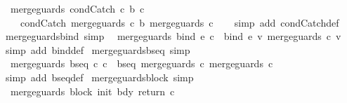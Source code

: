 \begin{isabellebody}
\ \ {\isachardoublequoteopen}merge{\isacharunderscore}guards\ {\isacharparenleft}condCatch\ c{}\ b\ c{}{\isacharparenright}\ {\isacharequal}\ \isanewline
\ \ \ \ condCatch\ {\isacharparenleft}merge{\isacharunderscore}guards\ c{}{\isacharparenright}\ b\ {\isacharparenleft}merge{\isacharunderscore}guards\ c{}{\isacharparenright}{\isachardoublequoteclose}\isanewline
%
\isadelimproof
\ \ %
\endisadelimproof
%
\isatagproof
{}\isamarkupfalse%
\ {\isacharparenleft}simp\ add{\isacharcolon}\ condCatch{\isacharunderscore}def{\isacharparenright}%
\endisatagproof
{\isafoldproof}%
%
\isadelimproof
\isanewline
%
\endisadelimproof
\isanewline
{}\isamarkupfalse%
\ merge{\isacharunderscore}guards{\isacharunderscore}bind\ {\isacharbrackleft}simp{\isacharbrackright}{\isacharcolon}\isanewline
\ \ {\isachardoublequoteopen}merge{\isacharunderscore}guards\ {\isacharparenleft}bind\ e\ c{\isacharparenright}\ {\isacharequal}\ bind\ e\ {\isacharparenleft}{\isasymlambda}v{\isachardot}\ merge{\isacharunderscore}guards\ {\isacharparenleft}c\ v{\isacharparenright}{\isacharparenright}{\isachardoublequoteclose}\isanewline
%
\isadelimproof
\ \ %
\endisadelimproof
%
\isatagproof
{}\isamarkupfalse%
\ {\isacharparenleft}simp\ add{\isacharcolon}\ bind{\isacharunderscore}def{\isacharparenright}%
\endisatagproof
{\isafoldproof}%
%
\isadelimproof
\isanewline
%
\endisadelimproof
\isanewline
{}\isamarkupfalse%
\ merge{\isacharunderscore}guards{\isacharunderscore}bseq\ {\isacharbrackleft}simp{\isacharbrackright}{\isacharcolon}\isanewline
\ \ {\isachardoublequoteopen}merge{\isacharunderscore}guards\ {\isacharparenleft}bseq\ c{}\ c{}{\isacharparenright}\ {\isacharequal}\ bseq\ {\isacharparenleft}merge{\isacharunderscore}guards\ c{}{\isacharparenright}\ {\isacharparenleft}merge{\isacharunderscore}guards\ c{}{\isacharparenright}{\isachardoublequoteclose}\isanewline
%
\isadelimproof
\ \ %
\endisadelimproof
%
\isatagproof
{}\isamarkupfalse%
\ {\isacharparenleft}simp\ add{\isacharcolon}\ bseq{\isacharunderscore}def{\isacharparenright}%
\endisatagproof
{\isafoldproof}%
%
\isadelimproof
\isanewline
%
\endisadelimproof
\isanewline
{}\isamarkupfalse%
\ merge{\isacharunderscore}guards{\isacharunderscore}block\ {\isacharbrackleft}simp{\isacharbrackright}{\isacharcolon}\isanewline
\ \ {\isachardoublequoteopen}merge{\isacharunderscore}guards\ {\isacharparenleft}block\ init\ bdy\ return\ c{\isacharparenright}\ {\isacharequal}\isanewline

\end{isabellebody}
